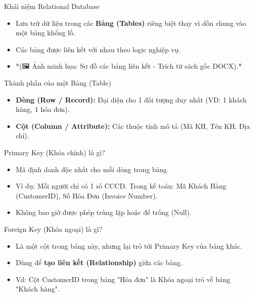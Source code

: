 \documentclass[aspectratio=169]{beamer}
\begin{document}
\begin{frame}{Khái niệm Relational Database}
    \begin{itemize}
        \item Lưu trữ dữ liệu trong các \textbf{Bảng (Tables)} riêng biệt thay vì dồn chung vào một bảng khổng lồ.
        \item Các bảng được liên kết với nhau theo logic nghiệp vụ.
        \item *(🖼️ Ảnh minh họa: Sơ đồ các bảng liên kết - Trích từ sách gốc DOCX).*
    \end{itemize}
\end{frame}


\begin{frame}{Thành phần của một Bảng (Table)}
    \begin{itemize}
        \item \textbf{Dòng (Row / Record):} Đại diện cho 1 đối tượng duy nhất (VD: 1 khách hàng, 1 hóa đơn).
        \item \textbf{Cột (Column / Attribute):} Các thuộc tính mô tả (Mã KH, Tên KH, Địa chỉ).
    \end{itemize}
\end{frame}


\begin{frame}{Primary Key (Khóa chính) là gì?}
    \begin{itemize}
        \item Mã định danh độc nhất cho mỗi dòng trong bảng.
        \item Ví dụ: Mỗi người chỉ có 1 số CCCD. Trong kế toán: Mã Khách Hàng (CustomerID), Số Hóa Đơn (Invoice Number).
        \item Không bao giờ được phép trùng lặp hoặc để trống (Null).
    \end{itemize}
\end{frame}


\begin{frame}{Foreign Key (Khóa ngoại) là gì?}
    \begin{itemize}
        \item Là một cột trong bảng này, nhưng lại trỏ tới Primary Key của bảng khác.
        \item Dùng để \textbf{tạo liên kết (Relationship)} giữa các bảng.
        \item Vd: Cột CustomerID trong bảng "Hóa đơn" là Khóa ngoại trỏ về bảng "Khách hàng".
    \end{itemize}
\end{frame}
\end{document}
